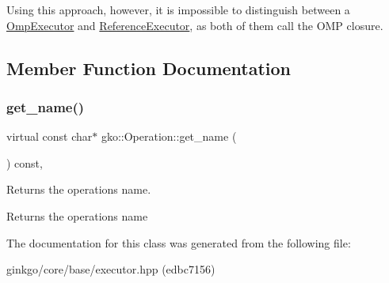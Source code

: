 Using this approach, however, it is impossible to distinguish between a \hyperlink{classgko_1_1OmpExecutor}{Omp\+Executor} and \hyperlink{classgko_1_1ReferenceExecutor}{Reference\+Executor}, as both of them call the O\+MP closure. 

\subsection{Member Function Documentation}
\mbox{\label{classgko_1_1Operation_ab3b940849d1daf02830f3387c52888d0}} 
\subsubsection{\texorpdfstring{get\+\_\+name()}{get\_name()}}
{\footnotesize\ttfamily virtual const char$\ast$ gko\+::\+Operation\+::get\+\_\+name (\begin{DoxyParamCaption}{ }\end{DoxyParamCaption}) const\hspace{0.3cm}{\ttfamily [virtual]}, {\ttfamily [noexcept]}}



Returns the operation\textquotesingle{}s name. 

\begin{DoxyReturn}{Returns}
the operation\textquotesingle{}s name 
\end{DoxyReturn}


The documentation for this class was generated from the following file\+:\begin{DoxyCompactItemize}
\item 
ginkgo/core/base/executor.\+hpp (edbc7156)\end{DoxyCompactItemize}
